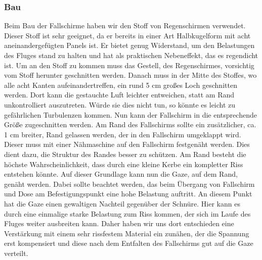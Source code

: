 \subsubsection{Bau}
Beim Bau der Fallschirme haben wir den Stoff von Regenschirmen verwendet. Dieser Stoff ist sehr geeignet, da er bereits in einer Art Halbkugelform mit acht aneinandergefügten Panels ist. Er bietet genug Widerstand, um den Belastungen des Fluges stand zu halten und hat als praktischen Nebeneffekt, das es regendicht ist. Um an den Stoff zu kommen muss das Gestell, des Regenschirmes, vorsichtig vom Stoff herunter geschnitten werden. Danach muss in der Mitte des Stoffes, wo alle acht Kanten aufeinandertreffen, ein rund 5 cm großes Loch geschnitten werden. Dort kann die gestauchte Luft leichter entweichen, statt am Rand unkontrolliert auszutreten. Würde sie dies nicht tun, so könnte es leicht zu gefährlichen Turbulenzen kommen. Nun kann der Fallschirm in die entsprechende Größe zugeschnitten werden. Am Rand des Fallschirms sollte ein zusätzlicher, ca. 1 cm breiter, Rand gelassen werden, der in den Fallschirm umgeklappt wird. Dieser muss mit einer Nähmaschine auf den Fallschirm festgenäht werden. Dies dient dazu, die Struktur des Randes besser zu schützen. Am Rand besteht die höchste Wahrscheinlichkeit, dass durch eine kleine Kerbe ein kompletter Riss entstehen könnte. Auf dieser Grundlage kann nun die Gaze, auf dem Rand, genäht werden. Dabei sollte beachtet werden, das beim Übergang von Fallschirm und Dose am Befestigungspunkt eine hohe Belastung auftritt. An diesem Punkt hat die Gaze einen gewaltigen Nachteil gegenüber der Schnüre. Hier kann es durch eine einmalige starke Belastung zum Riss kommen, der sich im Laufe des Fluges weiter ausbreiten kann. Daher haben wir uns dort entschieden eine Verstärkung mit einem sehr rissfestem Material ein zunähen, der die Spannung erst kompensiert und diese nach dem Entfalten des Fallschirms gut auf die Gaze verteilt.